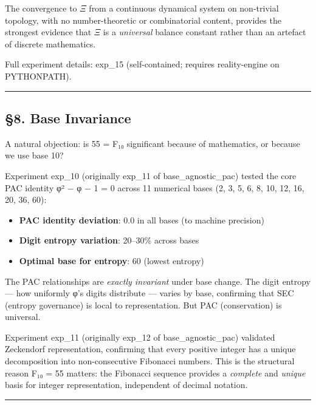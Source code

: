 \documentclass[
  11pt,
  a4paper]{article}
\providecommand{\tightlist}{%
  \setlength{\itemsep}{0pt}\setlength{\parskip}{0pt}}
\begin{document}
The convergence to \(\Xi\) from a continuous dynamical system on
non-trivial topology, with no number-theoretic or combinatorial content,
provides the strongest evidence that \(\Xi\) is a \emph{universal}
balance constant rather than an artefact of discrete mathematics.

Full experiment details: exp\_15 (self-contained; requires
reality-engine on PYTHONPATH).

\begin{center}\rule{0.5\linewidth}{0.5pt}\end{center}

\subsection{§8. Base Invariance}\label{base-invariance}

A natural objection: is 55 = F₁₀ significant because of mathematics, or
because we use base 10?

Experiment exp\_10 (originally exp\_11 of base\_agnostic\_pac) tested
the core PAC identity φ² − φ − 1 = 0 across 11 numerical bases (2, 3, 5,
6, 8, 10, 12, 16, 20, 36, 60):

\begin{itemize}
\tightlist
\item
  \textbf{PAC identity deviation}: 0.0 in all bases (to machine
  precision)
\item
  \textbf{Digit entropy variation}: 20--30\% across bases
\item
  \textbf{Optimal base for entropy}: 60 (lowest entropy)
\end{itemize}

The PAC relationships are \emph{exactly invariant} under base change.
The digit entropy --- how uniformly φ's digits distribute --- varies by
base, confirming that SEC (entropy governance) is local to
representation. But PAC (conservation) is universal.

Experiment exp\_11 (originally exp\_12 of base\_agnostic\_pac) validated
Zeckendorf representation, confirming that every positive integer has a
unique decomposition into non-consecutive Fibonacci numbers. This is the
structural reason F₁₀ = 55 matters: the Fibonacci sequence provides a
\emph{complete} and \emph{unique} basis for integer representation,
independent of decimal notation.

\begin{center}\rule{0.5\linewidth}{0.5pt}\end{center}
\end{document}

